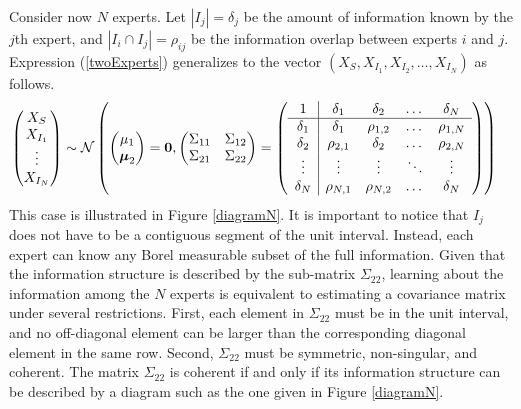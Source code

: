 \documentclass[11pt,twoside]{article}
\theoremstyle{definition}
\theoremstyle{definition}
\begin{document}
Consider now $N$ experts. Let $|I_j| = \delta_j$ be the amount of information known by the $j$th expert, and $|I_i \cap I_j| = \rho_{ij}$ be the information overlap between experts $i$ and $j$. Expression (\ref{twoExperts}) generalizes to the vector $(X_{S}, X_{I_1}, X_{I_2}, \dots, X_{I_N})$ as follows.
\begin{align}
\left(\begin{matrix} X_S \\ X_{I_1}\\ \vdots \\ X_{I_N} \end{matrix}\right) &\sim \mathcal{N}\left( \left(\begin{matrix} 
\mu_1 \\ \boldsymbol{\mu}_2
 \end{matrix}\right) =
 \boldsymbol{0}, \left(\begin{matrix} 
\Sigma_{11} & \Sigma_{12}\\
\Sigma_{21} & \Sigma_{22}\\
 \end{matrix}\right) 
 =
 \left(\begin{array}{c | c c cc }
1 & \delta_1 & \delta_2 & \dots & \delta_N  \\ \hline
\delta_1 & \delta_1 &\rho_{1,2} & \dots & \rho_{1,N}   \\ 
\delta_2 & \rho_{2,1} & \delta_2 & \dots & \rho_{2,N}  \\ 
\vdots & \vdots & \vdots & \ddots & \vdots  \\ 
\delta_N & \rho_{N,1} & \rho_{N,2} & \dots & \delta_N\\ 
 \end{array}\right)\right)  \label{NExperts}
\end{align}
This case is illustrated in Figure \ref{diagramN}. It is important to notice that $I_j$ does not have to be a contiguous segment of the unit interval. Instead, each expert can know any Borel measurable subset of the full information. Given that the information structure is described by the sub-matrix $\Sigma_{22}$, learning about the information among the $N$ experts is equivalent to estimating a covariance matrix under several restrictions. First, each element in $\Sigma_{22}$ must be in the unit interval, and no off-diagonal element can be larger than the corresponding diagonal element in the same row. Second, $\Sigma_{22}$ must be symmetric, non-singular, and coherent. The matrix $\Sigma_{22}$ is coherent if and only if its information structure can be described by a diagram such as the one given in Figure \ref{diagramN}. 
\end{document}
